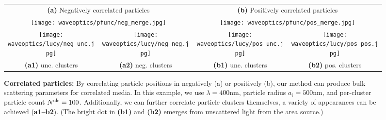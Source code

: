 \begin{figure}[h!]
    \centering
    \setlength{\resLen}{1.45in}
    \addtolength{\tabcolsep}{-3.5pt}
    \begin{tabular}{cc|cc}
        \multicolumn{2}{c|}{\textbf{(a)} Negatively correlated particles} &
        \multicolumn{2}{c}{\textbf{(b)} Positively correlated particles}
        \\
        \multicolumn{2}{c|}{\texttt{[image: waveoptics/pfunc/neg\_merge.jpg]}} & \multicolumn{2}{c}{\texttt{[image: waveoptics/pfunc/pos\_merge.jpg]}} 
        \\
        \texttt{[image: waveoptics/lucy/neg\_unc.jpg]} &
        \texttt{[image: waveoptics/lucy/neg\_neg.jpg]} &
        \texttt{[image: waveoptics/lucy/pos\_unc.jpg]} &
        \texttt{[image: waveoptics/lucy/pos\_pos.jpg]} 
        \\
        \textbf{(a1)} unc. clusters & \textbf{(a2)} neg. clusters & \textbf{(b1)} unc. clusters & \textbf{(b2)} pos. clusters
    \end{tabular}
    \caption[Correlated particles]{\label{fig:waveoptics:correlated}
        \textbf{Correlated particles:} By correlating particle positions in negatively (a) or positively (b), our method can produce bulk scattering parameters for correlated media.
        In this example, we use $\lambda = 400\text{nm}$, particle radius $a_i = 500\text{nm}$, and per-cluster particle count $N^\mathrm{cls} = 100$.
        Additionally, we can further correlate particle clusters themselves, a variety of appearances can be achieved (\textbf{a1--b2}).
        (The bright dot in \textbf{(b1)} and \textbf{(b2)} emerges from unscattered light from the area source.)
    }
\end{figure}

